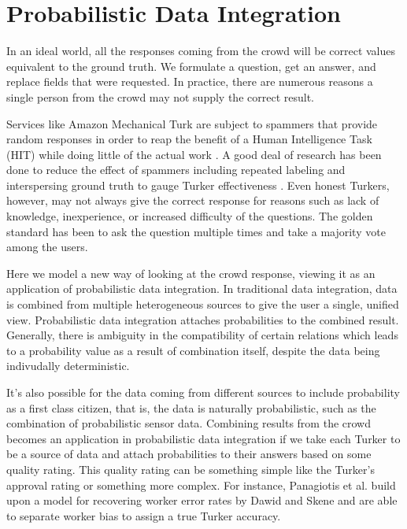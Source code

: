 \section{Probabilistic Data Integration}

In an ideal world, all the responses coming from the crowd will be correct values equivalent to the ground truth.  We formulate a question, get an answer, and replace fields that were requested.  In practice, there are numerous reasons a single person from the crowd may not supply the correct result.

Services like Amazon Mechanical Turk are subject to spammers that provide random responses in order to reap the benefit of a Human Intelligence Task (HIT) while doing little of the actual work \cite{Panos10}.  A good deal of research has been done to reduce the effect of spammers including repeated labeling \cite{Sheng:2008:GLI:1401890.1401965} and interspersing ground truth to gauge Turker effectiveness \cite{quinn10}.  Even honest Turkers, however, may not always give the correct response for reasons such as lack of knowledge, inexperience, or increased difficulty of the questions.  The golden standard has been to ask the question multiple times and take a majority vote among the users. 

Here we model a new way of looking at the crowd response, viewing it as an application of probabilistic data integration.  In traditional data integration, data is combined from multiple heterogeneous sources to give the user a single, unified view.  Probabilistic data integration attaches probabilities to the combined result.  Generally, there is ambiguity in the compatibility of certain relations which leads to a probability value as a result of combination itself, despite the data being indivudally deterministic.

It's also possible for the data coming from different sources to include probability as a first class citizen, that is, the data is naturally probabilistic, such as the combination of probabilistic sensor data.  Combining results from the crowd becomes an application in probabilistic data integration if we take each Turker to be a source of data and attach probabilities to their answers based on some quality rating.  This quality rating can be something simple like the Turker's approval rating or something more complex.  For instance, Panagiotis et al. \cite{Ipeirotis:2010:QMA:1837885.1837906} build upon a model for recovering worker error rates by Dawid and Skene \cite{dawid79} and are able to separate worker bias to assign a true Turker accuracy.


